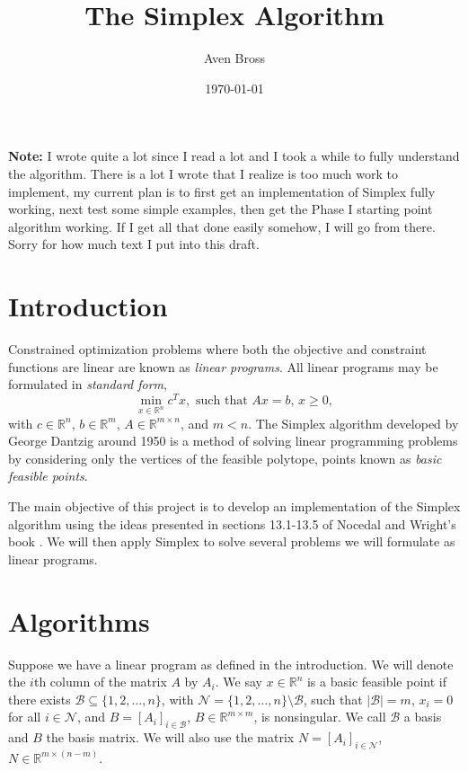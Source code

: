 \documentclass[12pt]{amsart}
\begin{document}
\title{The Simplex Algorithm}

\author{Aven Bross}

\date{\today}

\maketitle

\textbf{Note:} I wrote quite a lot since I read a lot and I took a while to fully
understand the algorithm. There is a lot I wrote that I realize is too much work to
implement, my current plan is to first get an implementation of Simplex fully working,
next test some simple examples, then get the Phase I starting point algorithm
working. If I get all that done easily somehow, I will go from there. Sorry for
how much text I put into this draft.

\section{Introduction}

Constrained optimization problems where both the objective and constraint
functions are linear are known as \emph{linear programs}. All linear programs
may be formulated in \emph{standard form},
\[
	\min_{x\in\mathbb{R}^n} c^Tx, \text{ such that } Ax=b \text{, } x\ge 0,
\]
with $c\in\mathbb{R}^n$, $b\in\mathbb{R}^m$, $A\in\mathbb{R}^{m\times n}$,
and $m<n$.
The Simplex algorithm developed by George Dantzig around 1950 is a method of
solving linear programming problems by considering only the vertices of the
feasible polytope, points known as \emph{basic feasible points}.

The main objective of this project is to develop an implementation of the
Simplex algorithm using the ideas presented in sections 13.1-13.5 of Nocedal and
Wright's book \cite{nocedalwright}. We will then apply Simplex to solve several
problems we will formulate as linear programs.


\section{Algorithms}

Suppose we have a linear program as defined in the introduction. We will denote
the $i$th column of the matrix $A$ by $A_i$. We say $x\in\mathbb{R}^n$ is a
basic feasible point if there
exists $\mathcal{B}\subseteq\{1,2,\ldots,n\}$,
with $\mathcal{N}=\{1,2,\ldots,n\}\setminus\mathcal{B}$, such that $|\mathcal{B}|=m$,
$x_i=0$ for all $i\in\mathcal{N}$, and $B=[A_i]_{i\in\mathcal{B}}$,
$B\in\mathbb{R}^{m\times m}$, is nonsingular. We call $\mathcal{B}$ a basis and
$B$ the basis matrix. We will also use the matrix $N=[A_i]_{i\in\mathcal{N}}$,
$N\in\mathbb{R}^{m\times(n-m)}$.
\end{document}

